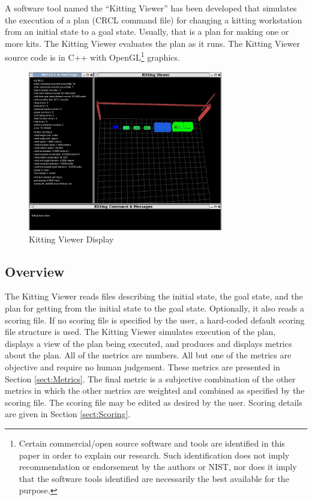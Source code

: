 A software tool named the ``Kitting Viewer'' has been developed that
simulates the execution of a plan (CRCL command file) for changing a
kitting workstation from an initial state to a goal state. Usually, that is
a plan for making one or more kits. The Kitting Viewer evaluates the plan
as it runs. The Kitting Viewer source code is in C++ with OpenGL\footnote{Certain commercial/open source software and tools are identified in this paper in order to explain our research. Such identification does not imply
recommendation or endorsement by the authors or NIST, nor does it imply that the software tools identified are necessarily the best available for the purpose.} graphics.

\begin{figure}[ht!]
\centering
\includegraphics[width=8.5cm]{images/kittingViewer2013Feb23.jpg}
\caption{Kitting Viewer Display}
\label{fig:KittingViewer}
\end{figure}

\subsection{Overview}

The Kitting Viewer reads files describing the initial state, the goal
state, and the plan for getting from the initial state to the goal state.
Optionally, it also reads a scoring file. If no scoring file is specified
by the user, a hard-coded default scoring file structure is used. The
Kitting Viewer simulates execution of the plan, displays a view of the plan
being executed, and produces and displays metrics about the plan. All of
the metrics are numbers. All but one of the metrics are objective and
require no human judgement. These metrics are presented in Section
\ref{sect:Metrics}. The final metric is a subjective combination of the
other metrics in which the other metrics are weighted and combined as
specified by the scoring file. The scoring file may be edited as desired by
the user. Scoring details are given in Section \ref{sect:Scoring}.

